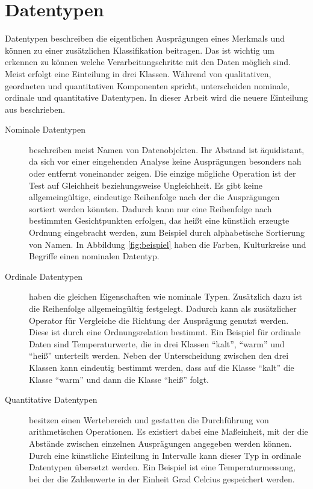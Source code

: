 \documentclass[a4paper, 12pt, DIV=calc, version=first, pdftex, headsepline, footsepline, bibtotocnumbered, liststotocnumbered]{scrreprt}
\begin{document}
\section{Datentypen}
\label{sec:Datentypen}
Datentypen beschreiben die eigentlichen Ausprägungen eines Merkmals und können zu einer zusätzlichen
Klassifikation beitragen. Das ist wichtig um erkennen zu können welche Verarbeitungschritte mit den Daten
möglich sind. Meist erfolgt eine Einteilung in drei Klassen. Während \citep{Bertin} von qualitativen,
geordneten und quantitativen Komponenten spricht, unterscheiden \citep{Preim} nominale, ordinale und
quantitative Datentypen.
In dieser Arbeit wird die neuere Einteilung aus \citep{Preim} beschrieben.
\begin{description}
\item[Nominale Datentypen]
beschreiben meist Namen von Datenobjekten. Ihr Abstand ist äquidistant, da sich vor einer eingehenden Analyse
keine Ausprägungen besonders nah oder entfernt voneinander zeigen. Die einzige mögliche Operation ist der Test auf
Gleichheit beziehungsweise Ungleichheit. Es gibt keine allgemeingültige, eindeutige Reihenfolge
nach der die Ausprägungen sortiert werden könnten. Dadurch kann nur eine Reihenfolge nach bestimmten Gesichtpunkten erfolgen,
das heißt eine künstlich erzeugte Ordnung eingebracht werden, zum Beispiel durch alphabetische Sortierung von Namen.
In Abbildung \ref{fig:beispiel} haben die Farben, Kulturkreise und Begriffe einen nominalen Datentyp.
\item[Ordinale Datentypen]
haben die gleichen Eigenschaften wie nominale Typen.
Zusätzlich dazu ist die Reihenfolge allgemeingültig festgelegt. Dadurch kann als zusätzlicher Operator für Vergleiche die Richtung der
Ausprägung genutzt werden. Diese ist durch eine Ordnungsrelation bestimmt. Ein Beispiel für ordinale Daten sind Temperaturwerte,
die in drei Klassen "`kalt"', "`warm"' und "`heiß"' unterteilt werden. Neben der Unterscheidung zwischen den drei
Klassen kann eindeutig bestimmt werden, dass auf die Klasse "`kalt"' die Klasse "`warm"' und dann die Klasse
"`heiß"' folgt. 
\item[Quantitative Datentypen] besitzen einen Wertebereich und gestatten die Durchführung von arithmetischen Operationen.
Es existiert dabei eine Maßeinheit, mit der die Abstände zwischen einzelnen Ausprägungen angegeben werden können. Durch eine 
künstliche Einteilung in Intervalle kann dieser Typ in ordinale Datentypen übersetzt werden.
Ein Beispiel ist eine Temperaturmessung, bei der die Zahlenwerte in der Einheit Grad Celcius gespeichert werden.
\end{description}
\end{document}
